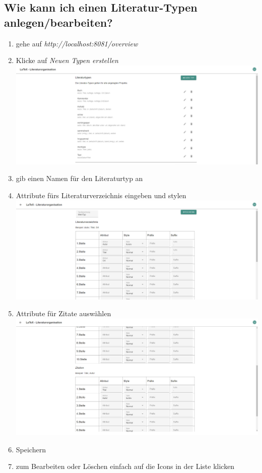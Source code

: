 \documentclass[12pt]{article}
\begin{document}
\subsection{Wie kann ich einen Literatur-Typen anlegen/bearbeiten?}
\begin{enumerate}
\item gehe auf \textit{http://localhost:8081/overview}
\item Klicke auf \textit{Neuen Typen erstellen}\newline
\includegraphics[width=\linewidth]{dokuImages/gui1_1.png}
\item gib einen Namen für den Literaturtyp an
\item Attribute fürs Literaturverzeichnis eingeben und stylen\\
\includegraphics[width=\linewidth]{dokuImages/gui1_2.png}
\item Attribute für Zitate auswählen\\
\includegraphics[width=\linewidth]{dokuImages/gui1_3.png}
\item Speichern
\item zum Bearbeiten oder Löschen einfach auf die Icons in der Liste klicken
\end{enumerate}
\end{document}
